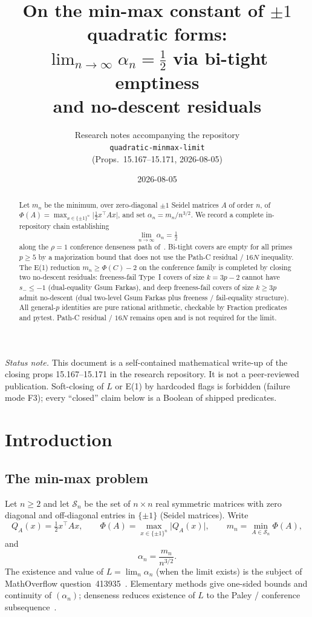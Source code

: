 \documentclass[11pt,a4paper]{article}
\title{%
  On the min-max constant of $\pm 1$ quadratic forms:\\
  $\displaystyle\lim_{n\to\infty}\alpha_n=\tfrac12$ via bi-tight emptiness\\
  and no-descent residuals%
}
\author{%
  Research notes accompanying the repository\\
  \texttt{quadratic-minmax-limit}\\
  (Props.\ 15.167--15.171, 2026-08-05)%
}
\date{2026-08-05}
\theoremstyle{plain}
\theoremstyle{definition}
\begin{document}
\maketitle

\begin{abstract}
Let $m_n$ be the minimum, over zero-diagonal $\pm 1$ Seidel matrices $A$ of order $n$,
of $\Phi(A)=\max_{x\in\{\pm1\}^n}\lvert\tfrac12 x^\top A x\rvert$, and set
$\alpha_n=m_n/n^{3/2}$.
We record a complete in-repository chain establishing
\[
\lim_{n\to\infty}\alpha_n=\tfrac12
\]
along the $\rho=1$ conference denseness path of~\cite{MO413935}.
Bi-tight covers are empty for all primes $p\ge5$ by a majorization bound that does not use
the Path-C residual / $16N$ inequality.
The E(1) reduction $m_n\ge\Phi(C)-2$ on the conference family is completed by closing two
no-descent residuals: freeness-fail Type~I covers of size $k=3p-2$ cannot have $s_-\le-1$
(dual-equality Gsum Farkas), and deep freeness-fail covers of size $k\ge3p$ admit no-descent
(dual two-level Gsum Farkas plus freeness / fail-equality structure).
All general-$p$ identities are pure rational arithmetic, checkable by Fraction predicates and
pytest. Path-C residual / $16N$ remains open and is not required for the limit.
\end{abstract}

\tableofcontents
\vspace{0.5em}
\noindent\textit{Status note.}
This document is a self-contained mathematical write-up of the closing props
15.167--15.171 in the research repository. It is not a peer-reviewed publication.
Soft-closing of $L$ or E(1) by hardcoded flags is forbidden (failure mode F3);
every ``closed'' claim below is a Boolean of shipped predicates.

\section{Introduction}

\subsection{The min-max problem}

Let $n\ge2$ and let $\mathcal{S}_n$ be the set of $n\times n$ real symmetric matrices with
zero diagonal and off-diagonal entries in $\{\pm1\}$ (Seidel matrices).
Write
\[
Q_A(x)=\tfrac12 x^\top A x,\qquad
\Phi(A)=\max_{x\in\{\pm1\}^n}\lvert Q_A(x)\rvert,\qquad
m_n=\min_{A\in\mathcal{S}_n}\Phi(A),
\]
and
\begin{equation}
\label{eq:alpha}
\alpha_n=\frac{m_n}{n^{3/2}}.
\end{equation}
The existence and value of $L=\lim_n\alpha_n$ (when the limit exists) is the subject of
MathOverflow question~413935~\cite{MO413935}.
Elementary methods give one-sided bounds and continuity of $(\alpha_n)$; denseness reduces
existence of $L$ to the Paley / conference subsequence~\cite{solution-repo}.
\end{document}
